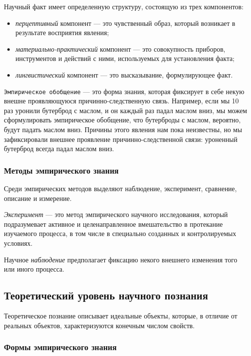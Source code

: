 Научный факт имеет определенную структуру, состоящую из трех
компонентов:
\begin{itemize}
    \item \textit{перцептивный} компонент --- это чувственный образ, который возникает в
    результате восприятия явления;
    \item \textit{материально-практический} компонент --- это
    совокупность приборов, инструментов и действий с ними, используемых для
    установления факта;
    \item \textit{лингвистический} компонент --- это высказывание, формулирующее факт.
\end{itemize}


\texttt{Эмпирическое обобщение} --- это форма знания, которая фиксирует в
себе некую внешне проявляющуюся причинно-следственную связь. Например, если мы 10 раз уронили бутерброд с маслом, и он каждый раз падал маслом вниз, мы можем сформулировать эмпирическое обобщение, что бутерброды с маслом, вероятно, будут падать маслом вниз. Причины этого явления нам пока неизвестны, но мы зафиксировали внешнее проявление причинно-следственной связи: уроненный бутерброд всегда падал маслом вниз.

\subsubsection{Методы эмпирического знания}

Среди эмпирических методов выделяют наблюдение, эксперимент, сравнение, описание и измерение.

\textit{Эксперимент} --- это метод эмпирического научного
исследования, который подразумевает активное и целенаправленное вмешательство в
протекание изучаемого процесса, в том числе в специально созданных и
контролируемых условиях. 

Научное \textit{наблюдение} предполагает фиксацию некого внешнего изменения того или иного процесса. 

\subsection{Теоретический уровень научного познания}

Теоретическое познание описывает идеальные объекты,
которые, в отличие от реальных объектов, характеризуются конечным числом свойств. 

\subsubsection{Формы эмпирического знания}


